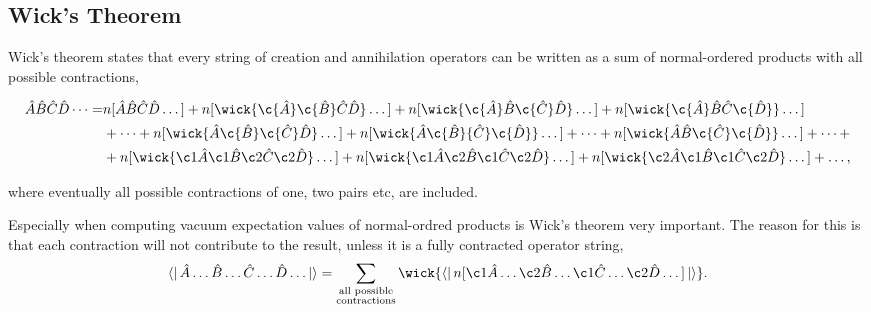 	\subsection{Wick's Theorem}
		Wick's theorem states that every string of creation and annihilation operators can
		be written as a sum of normal-ordered products with all possible contractions,
	
		\begin{equation}
			\begin{aligned}
			\hat{A}\hat{B}\hat{C}\hat{D}\dots
			=&n[\hat{A}\hat{B}\hat{C}\hat{D}\dots]
			+ n[\wick{\c{\hat{A}}\c{\hat{B}}\hat{C}\hat{D}}\dots]
			+ n[\wick{\c{\hat{A}}\hat{B}\c{\hat{C}}\hat{D}}\dots]
			+ n[\wick{\c{\hat{A}}\hat{B}\hat{C}\c{\hat{D}}}\dots] \\
			&+ \dots
			+ n[\wick{{\hat{A}}\c{\hat{B}}\c{\hat{C}}\hat{D}}\dots]
			+ n[\wick{{\hat{A}}\c{\hat{B}}{\hat{C}}\c{\hat{D}}}\dots]
			+ \dots 
			+ n[\wick{{\hat{A}}{\hat{B}}\c{\hat{C}}\c{\hat{D}}}\dots]
			+ \dots + \\
			&+ n[\wick{\c1{\hat{A}}\c1{\hat{B}}\c2{\hat{C}}\c2{\hat{D}}}\dots]
			+ n[\wick{\c1{\hat{A}}\c2{\hat{B}}\c1{\hat{C}}\c2{\hat{D}}}\dots]
			+ n[\wick{\c2{\hat{A}}\c1{\hat{B}}\c1{\hat{C}}\c2{\hat{D}}}\dots]
			+ \dots,
		\end{aligned}
		\end{equation}

		where eventually all possible contractions of one, two pairs etc, are included.

		Especially when computing vacuum expectation values of normal-ordred products is 
		Wick's theorem very important. The reason for this is that each contraction will 
		not contribute to the result, unless it is a fully contracted operator string,
		\begin{equation} 
			\bra{}\hat{A} \dots \hat{B} \dots \hat{C} \dots \hat{D} \dots \ket{}
				= \sum_{\substack{\text{all possible} \\ \text{contractions}}}
				\wick{
				\bra{} n[\c1{\hat{A}} \dots \c2{\hat{B}} \dots 
				\c1{\hat{C}} \dots \c2{\hat{D}} \dots] \ket{}
				}.
		\end{equation}

